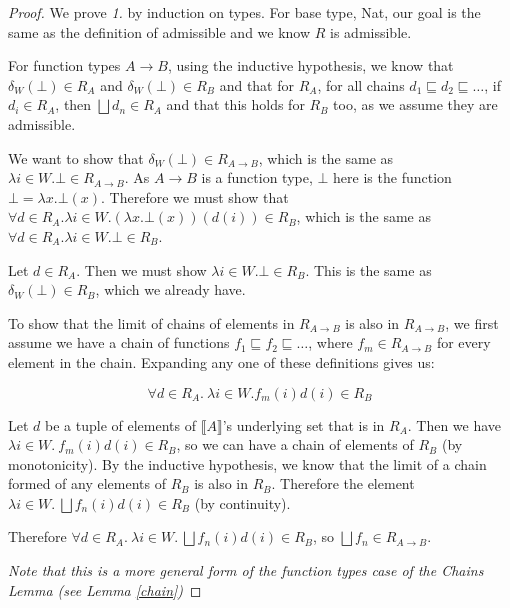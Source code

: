 \begin{proof}
We prove \emph{1.} by induction on types. For base type, Nat, our goal is the same as the definition of admissible and we know $R$ is admissible. 

For function types $A \to B$, using the inductive hypothesis, we know that $\delta_W(\bot) \in R_A$ and $\delta_W(\bot) \in R_B$ and that for $R_A$, for all chains $d_1 \sqsubseteq d_2 \sqsubseteq \dots$, if  $d_i \in R_A$, then $\bigsqcup d_n \in R_A$ and that this holds for $R_B$ too, as we assume they are admissible. 

We want to show that $\delta_W(\bot) \in R_{A \to B}$, which is the same as $\lambda i \in W. \bot \in R_{A \to B}$. As $A \to B$ is a function type, $\bot$ here is the function $\bot = \lambda x. \bot(x)$. Therefore we must show that $\forall d \in R_A. \lambda i \in W. (\lambda x. \bot(x))(d(i)) \in R_B$, which is the same as $\forall d \in R_A. \lambda i \in W. \bot \in R_B$.

Let $d \in R_A$. Then we must show $\lambda i \in W. \bot \in R_B$. This is the same as $\delta_W(\bot) \in R_B$, which we already have.

\vspace{0.5cm}

To show that the limit of chains of elements in  $R_{A \to B}$ is also in $R_{A \to B}$, we first assume we have a chain of functions $f_1 \sqsubseteq f_2 \sqsubseteq \dots$, where $f_m \in R_{A \to B}$ for every element in the chain. Expanding any one of these definitions gives us:

\[ \forall d \in R_A. \ \lambda i \in W. f_m(i)d(i) \in R_B\]

Let $d$ be a tuple of elements of $\llbracket A \rrbracket$'s underlying set that is in $R_A$. Then we have $\lambda i \in W. \ f_m(i)d(i) \in R_B$, so we can have a chain of elements of $R_B$ (by monotonicity). By the inductive hypothesis, we know that the limit of a chain formed of  any elements of $R_B$ is also in $R_B$. Therefore the element $\lambda i \in W. \ \bigsqcup f_n(i)d(i) \in R_B$ (by continuity).

Therefore $\forall d \in R_A. \ \lambda i \in W. \ \bigsqcup f_n(i)d(i) \in R_B$, so $\bigsqcup f_n \in R_{A \to B}$.

\emph{Note that this is a more general form of the function types case of the Chains Lemma (see Lemma \ref{chain})}

\vspace{0.5cm}


 
\end{proof}

